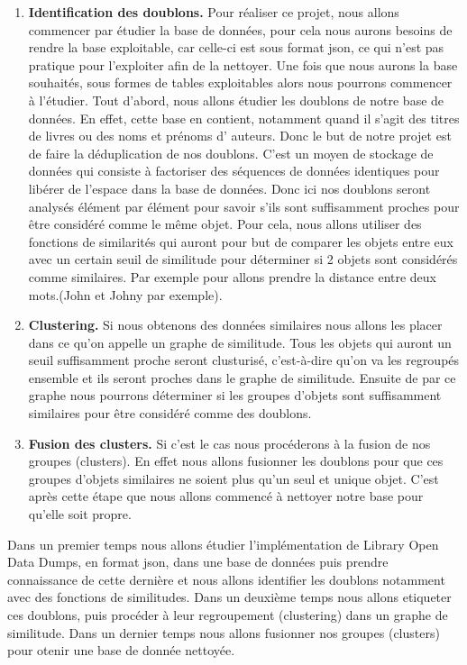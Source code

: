 \documentclass[12pt, a4paper]{article}
\begin{document}
\begin{enumerate}
\item \textbf{Identification des doublons.} Pour réaliser ce projet, nous allons commencer par étudier la base de données, pour cela nous aurons besoins de rendre la base exploitable, car celle-ci est sous format json, ce qui n’est pas pratique pour l’exploiter afin de la nettoyer. Une fois que nous aurons la base souhaités, sous formes de tables exploitables alors nous pourrons commencer à l’étudier.
Tout d’abord, nous allons  étudier les doublons de notre base de données. En effet, cette base en contient, notamment quand il s'agit des titres de livres ou des noms et prénoms d' auteurs. Donc le but de notre projet est de faire la déduplication de nos doublons. C’est un moyen de stockage de données qui consiste à  factoriser des séquences de données identiques pour libérer de l’espace dans la base de données. Donc ici nos doublons seront analysés élément par élément pour savoir s’ils sont suffisamment proches pour être considéré comme le même objet.
Pour cela, nous allons utiliser des fonctions de similarités qui auront pour but de comparer les objets entre eux avec un certain seuil de similitude pour déterminer si 2 objets sont considérés comme similaires. Par exemple pour allons prendre la distance entre deux mots.(John et Johny par exemple).



\item \textbf{Clustering.}
Si nous obtenons des données similaires nous allons les placer dans ce qu’on appelle un graphe de similitude. Tous les objets qui auront un seuil suffisamment proche seront clusturisé, c’est-à-dire qu’on va les regroupés ensemble et ils seront proches dans le graphe de similitude. Ensuite de par ce  graphe nous pourrons déterminer si les groupes d’objets sont suffisamment similaires pour être considéré comme des doublons.


\item \textbf{Fusion des clusters.} Si c’est le cas nous procéderons à la fusion de nos groupes (clusters). En effet nous allons fusionner les doublons pour que ces groupes d’objets similaires ne soient plus qu’un seul et unique objet. C'est après cette étape que nous allons commencé à nettoyer notre base pour qu'elle soit propre. 


\end{enumerate}


Dans un premier temps nous allons étudier l'implémentation de Library Open Data Dumps, en format json, dans une base de données puis prendre connaissance de cette dernière et nous allons identifier les doublons notamment avec des fonctions de similitudes.
Dans un deuxième temps nous allons etiqueter ces doublons, puis procéder à leur regroupement (clustering) dans un graphe de similitude.
Dans un dernier temps nous allons fusionner nos groupes (clusters) pour otenir une base de donnée nettoyée.
\end{document}
